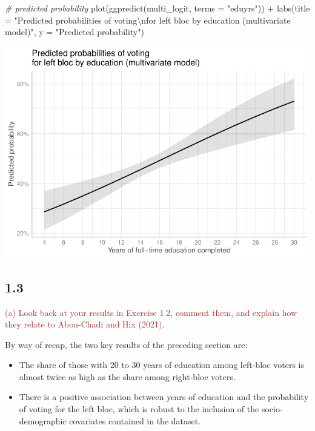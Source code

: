 \documentclass[
]{article}
\newenvironment{Shaded}{\begin{snugshade}}{\end{snugshade}}
\newcommand{\AttributeTok}[1]{\textcolor[rgb]{0.77,0.63,0.00}{#1}}
\newcommand{\CommentTok}[1]{\textcolor[rgb]{0.56,0.35,0.01}{\textit{#1}}}
\newcommand{\FunctionTok}[1]{\textcolor[rgb]{0.00,0.00,0.00}{#1}}
\newcommand{\NormalTok}[1]{#1}
\newcommand{\SpecialCharTok}[1]{\textcolor[rgb]{0.00,0.00,0.00}{#1}}
\newcommand{\StringTok}[1]{\textcolor[rgb]{0.31,0.60,0.02}{#1}}
\begin{document}
\begin{Shaded}
\begin{Highlighting}[]
\CommentTok{\# predicted probability }
\FunctionTok{plot}\NormalTok{(}\FunctionTok{ggpredict}\NormalTok{(multi\_logit, }\AttributeTok{terms =} \StringTok{"eduyrs"}\NormalTok{)) }\SpecialCharTok{+}
  \FunctionTok{labs}\NormalTok{(}\AttributeTok{title =} \StringTok{"Predicted probabilities of voting}\SpecialCharTok{\textbackslash{}n}\StringTok{for left bloc by education (multivariate model)"}\NormalTok{, }
       \AttributeTok{y =} \StringTok{"Predicted probability"}\NormalTok{)}
\end{Highlighting}
\end{Shaded}

\begin{center}\includegraphics{AVCD-Assignment1-Edenhofer_files/figure-latex/multi-logit-plot-1} \end{center}

\hypertarget{section-2}{%
\subsection{1.3}\label{section-2}}

\textcolor{brown}{(a) Look back at your results in Exercise 1.2, comment them, and explain how they relate to Abou-Chadi and Hix (2021).}

By way of recap, the two key results of the preceding section are:

\begin{itemize}
\item
  The share of those with 20 to 30 years of education among left-bloc
  voters is almost twice as high as the share among right-bloc voters.
\item
  There is a positive association between years of education and the
  probability of voting for the left bloc, which is robust to the
  inclusion of the socio-demographic covariates contained in the
  dataset.
\end{itemize}
\end{document}
